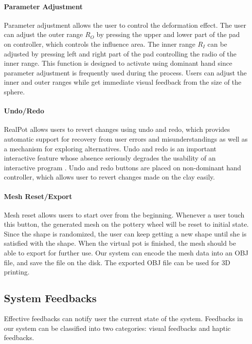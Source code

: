 \documentclass{svjour3}                     %
\begin{document}
\paragraph{Parameter Adjustment}
Parameter adjustment allows the user to control the deformation effect.
The user can adjust the outer range $R_{O}$ by pressing the upper and lower part of the pad on controller, which controls the influence area. The inner range $R_{I}$ can be adjusted by pressing left and right part of the pad controlling the radio of the inner range. This function is designed to activate using dominant hand since parameter adjustment is frequently used during the process. Users can adjust the inner and outer ranges while get immediate visual feedback from the size of the sphere.

\paragraph{Undo/Redo}
RealPot allows users to revert changes using undo and redo, which provides automatic support for recovery from user errors and misunderstandings as well as a mechanism for exploring alternatives.
Undo and redo is an important interactive feature whose absence seriously degrades the usability of an interactive program \cite{choudhary1995general}.
Undo and redo buttons are placed on non-dominant hand controller, which allows user to revert changes made on the clay easily.

\paragraph{Mesh Reset/Export}
Mesh reset allows users to start over from the beginning.
Whenever a user touch this button, the generated mesh on the pottery wheel will be reset to initial state. Since the shape is randomized, the user can keep getting a new shape until she is satisfied with the shape.
When the virtual pot is finished, the mesh should be able to export for further use. Our system can encode the mesh data into an OBJ file, and save the file on the disk. The exported OBJ file can be used for 3D printing.

\subsection{System Feedbacks}
\label{sec:4.4}
Effective feedbacks can notify user the current state of the system. Feedbacks in our system can be classified into two categories: visual feedbacks and haptic feedbacks.
\end{document}
